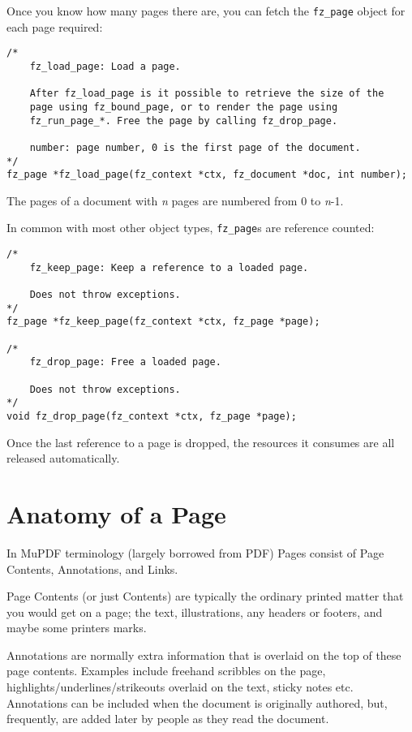 \documentclass[oneside]{book}
\begin{document}
Once you know how many pages there are, you can fetch the \texttt{fz\_page} object for each page required:

\begin{lstlisting}
/*
	fz_load_page: Load a page.

	After fz_load_page is it possible to retrieve the size of the
	page using fz_bound_page, or to render the page using
	fz_run_page_*. Free the page by calling fz_drop_page.

	number: page number, 0 is the first page of the document.
*/
fz_page *fz_load_page(fz_context *ctx, fz_document *doc, int number);
\end{lstlisting}

The pages of a document with \textit{n} pages are numbered from 0 to \textit{n}-1.

In common with most other object types, \texttt{fz\_page}s are reference counted:

\begin{lstlisting}
/*
	fz_keep_page: Keep a reference to a loaded page.

	Does not throw exceptions.
*/
fz_page *fz_keep_page(fz_context *ctx, fz_page *page);

/*
	fz_drop_page: Free a loaded page.

	Does not throw exceptions.
*/
void fz_drop_page(fz_context *ctx, fz_page *page);
\end{lstlisting}

Once the last reference to a page is dropped, the resources it consumes are all released automatically.


\section{Anatomy of a Page}
\label{PageAnatomy}

In MuPDF terminology (largely borrowed from PDF) Pages consist of Page Contents, Annotations, and Links.

Page Contents (or just Contents) are typically the ordinary printed matter that you would get on a page; the text, illustrations, any headers or footers, and maybe some printers marks.

Annotations are normally extra information that is overlaid on the top of these page contents. Examples include freehand scribbles on the page, highlights\slash underlines\slash strikeouts overlaid on the text, sticky notes etc. Annotations can be included when the document is originally authored, but, frequently, are added later by people as they read the document.
\end{document}
